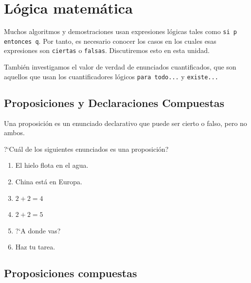 \section{Lógica matemática}


    Muchos algoritmos y demostraciones usan expresiones lógicas tales como
    \texttt{si p entonces q}. Por tanto, es necesario conocer los casos en los cuales esas expresiones son \texttt{ciertas} o \texttt{falsas}. Discutiremos esto en esta unidad. 

    También investigamos el valor de verdad de enunciados cuantificados, que son aquellos que usan los cuantificadores lógicos \texttt{para todo...} y \texttt{existe...}


\subsection{Proposiciones y Declaraciones Compuestas}

    Una proposición es un enunciado declarativo que puede ser cierto o falso, pero no ambos. 

    \begin{resuelto}
        ?`Cuál de los siguientes enunciados es una proposición?
        \begin{multicols}{2}
            \begin{enumerate}
                \item El hielo flota en el agua.
                \item China está en Europa.
                \item $2+2=4$
                \item $2+2=5$
                \item ?`A donde vas?
                \item Haz tu tarea.
            \end{enumerate}
        \end{multicols}
    \end{resuelto}
    


\subsection{Proposiciones compuestas}


